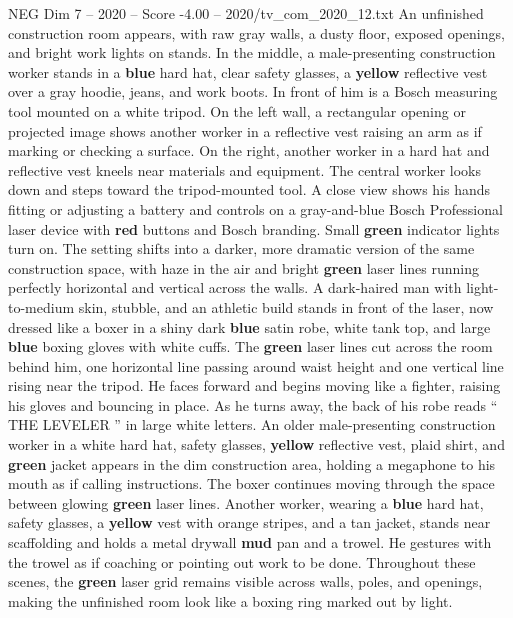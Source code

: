 \begin{textsample}{NEG Dim 7 – 2020 – Score -4.00 – 2020/tv\_com\_2020\_12.txt}  \label{ex:f7_neg_009}
An unfinished construction room appears, with raw gray walls, a dusty floor, exposed openings, and bright work lights on stands.
In the middle, a male-presenting construction worker stands in a \textbf{blue} hard hat, clear safety glasses, a \textbf{yellow} reflective vest over a gray hoodie, jeans, and work boots.
In front of him is a Bosch measuring tool mounted on a white tripod.
On the left wall, a rectangular opening or projected image shows another worker in a reflective vest raising an arm as if marking or checking a surface.
On the right, another worker in a hard hat and reflective vest kneels near materials and equipment.
The central worker looks down and steps toward the tripod-mounted tool.
A close view shows his hands fitting or adjusting a battery and controls on a gray-and-blue Bosch Professional laser device with \textbf{red} buttons and Bosch branding.
Small \textbf{green} indicator lights turn on.
The setting shifts into a darker, more dramatic version of the same construction space, with haze in the air and bright \textbf{green} laser lines running perfectly horizontal and vertical across the walls.
A dark-haired man with light-to-medium skin, stubble, and an athletic build stands in front of the laser, now dressed like a boxer in a shiny dark \textbf{blue} satin robe, white tank top, and large \textbf{blue} boxing gloves with white cuffs.
The \textbf{green} laser lines cut across the room behind him, one horizontal line passing around waist height and one vertical line rising near the tripod.
He faces forward and begins moving like a fighter, raising his gloves and bouncing in place.
As he turns away, the back of his robe reads “ THE LEVELER ” in large white letters.
An older male-presenting construction worker in a white hard hat, safety glasses, \textbf{yellow} reflective vest, plaid shirt, and \textbf{green} jacket appears in the dim construction area, holding a megaphone to his mouth as if calling instructions.
The boxer continues moving through the space between glowing \textbf{green} laser lines.
Another worker, wearing a \textbf{blue} hard hat, safety glasses, a \textbf{yellow} vest with orange stripes, and a tan jacket, stands near scaffolding and holds a metal drywall \textbf{mud} pan and a trowel.
He gestures with the trowel as if coaching or pointing out work to be done.
Throughout these scenes, the \textbf{green} laser grid remains visible across walls, poles, and openings, making the unfinished room look like a boxing ring marked out by light.

\end{textsample}
